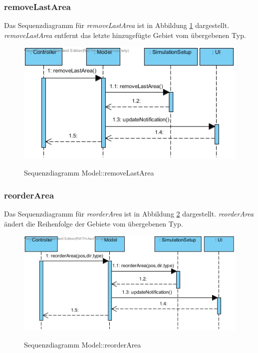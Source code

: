 \subsubsection*{removeLastArea}

Das Sequenzdiagramm für \emph{removeLastArea} ist in Abbildung \ref{Sequenzdiagramm Model::removeLastArea} dargestellt. \emph{removeLastArea} entfernt das letzte hinzugefügte Gebiet vom übergebenen Typ.

\begin{figure}[H]
	\centering
	\includegraphics[scale=.85]{Bilder/Model__removeLastArea().jpg}\\
	\caption{Sequenzdiagramm Model::removeLastArea}
	\label{Sequenzdiagramm Model::removeLastArea}
\end{figure}

\subsubsection*{reorderArea}

Das Sequenzdiagramm für \emph{reorderArea} ist in Abbildung \ref{Sequenzdiagramm Model::reorderArea} dargestellt. \emph{reorderArea} ändert die Reihenfolge der Gebiete vom übergebenen Typ.

\begin{figure}[H]
	\centering
	\includegraphics[scale=.85]{Bilder/Model__reorderArea().jpg}\\
	\caption{Sequenzdiagramm Model::reorderArea}
	\label{Sequenzdiagramm Model::reorderArea}
\end{figure}

